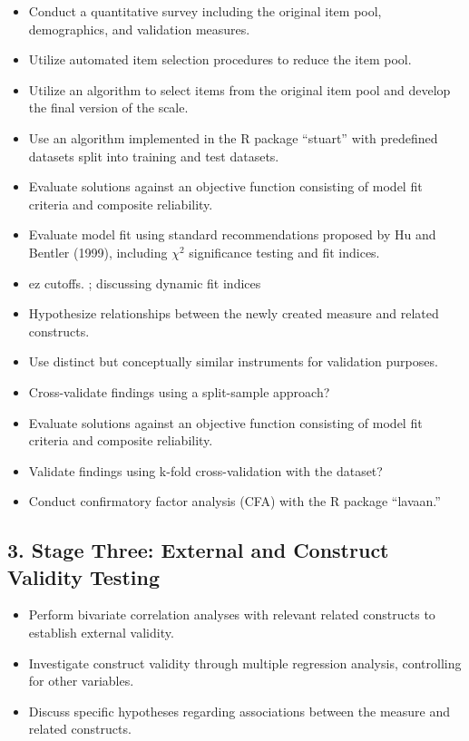 \documentclass[
  12pt,
  a4paper,
  twoside]{article}
\providecommand{\tightlist}{%
  \setlength{\itemsep}{0pt}\setlength{\parskip}{0pt}}
\begin{document}
\begin{itemize}
\tightlist
\item
  Conduct a quantitative survey including the original item pool, demographics, and validation measures.
\item
  Utilize automated item selection procedures to reduce the item pool.
\item
  Utilize an algorithm to select items from the original item pool and develop the final version of the scale.
\item
  Use an algorithm implemented in the R package ``stuart'' with predefined datasets split into training and test datasets.
\item
  Evaluate solutions against an objective function consisting of model fit criteria and composite reliability.
\item
  Evaluate model fit using standard recommendations proposed by Hu and Bentler (1999), including \(\chi^2\) significance testing and fit indices.
\item
  ez cutoffs. ; discussing dynamic fit indices
\item
  Hypothesize relationships between the newly created measure and related constructs.
\item
  Use distinct but conceptually similar instruments for validation purposes.
\item
  Cross-validate findings using a split-sample approach?
\item
  Evaluate solutions against an objective function consisting of model fit criteria and composite reliability.
\item
  Validate findings using k-fold cross-validation with the dataset?
\item
  Conduct confirmatory factor analysis (CFA) with the R package ``lavaan.''
\end{itemize}

\subsection{3. Stage Three: External and Construct Validity Testing}\label{stage-three-external-and-construct-validity-testing}

\begin{itemize}
\tightlist
\item
  Perform bivariate correlation analyses with relevant related constructs to establish external validity.
\item
  Investigate construct validity through multiple regression analysis, controlling for other variables.
\item
  Discuss specific hypotheses regarding associations between the measure and related constructs.
\end{itemize}
\end{document}
